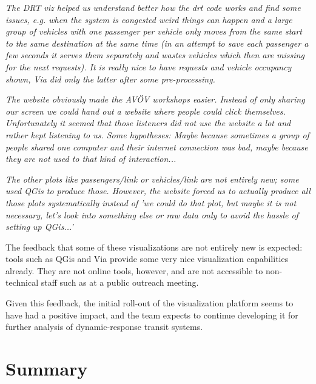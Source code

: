\small{

\begin{displayquote}\emph{
  The DRT viz helped us understand better how the drt code works and find some issues, e.g. when the system is congested weird things can happen and a large group of vehicles with one passenger per vehicle only moves from the same start to the same destination at the same time (in an attempt to save each passenger a few seconds it serves them separately and wastes vehicles which then are missing for the next requests). It is really nice to have requests and vehicle occupancy shown, Via did only the latter after some pre-processing.
}\end{displayquote}

\begin{displayquote}\emph{
  The website obviously made the AVÖV workshops easier. Instead of only sharing our screen we could hand out a website where people could click themselves. Unfortunately it seemed that those listeners did not use the website a lot and rather kept listening to us. Some hypotheses: Maybe because sometimes a group of people shared one computer and their internet connection was bad, maybe because they are not used to that kind of interaction...
}\end{displayquote}

\begin{displayquote}\emph{
  The other plots like passengers/link or vehicles/link are not entirely new; some used QGis to produce those. However, the website forced us to actually produce all those plots systematically instead of 'we could do that plot, but maybe it is not necessary, let's look into something else or raw data only to avoid the hassle of setting up QGis...'
}\end{displayquote}

}

The feedback that some of these visualizations are not entirely new is expected: tools such as QGis and Via provide some very nice visualization capabilities already. They are not online tools, however, and are not accessible to non-technical staff such as at a public outreach meeting.

Given this feedback, the initial roll-out of the visualization platform seems to have had a positive impact, and the team expects to continue developing it for further analysis of dynamic-response transit systems.

\section{Summary}
\label{avov-summary}

